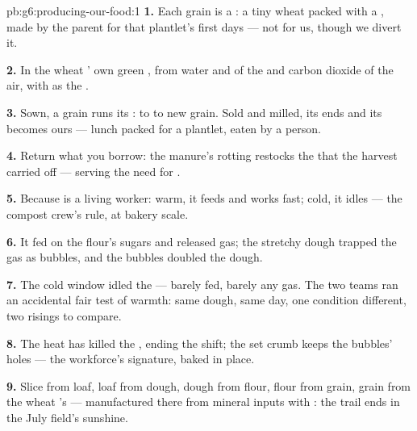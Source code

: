 \begin{solution}{pb:g6:producing-our-food:1}
\textbf{1.} Each grain is a : a tiny wheat  packed
with a , made by the parent for that plantlet's
first days --- not for us, though we divert it.

\textbf{2.} In the wheat ' own green , from
water and  of the  and carbon dioxide of
the air, with  as the .

\textbf{3.} Sown, a grain runs its : 
to  to new grain. Sold and milled, its  ends
and its  becomes ours --- lunch packed for a
plantlet, eaten by a person.

\textbf{4.} Return what you borrow: the manure's rotting
restocks the  that the harvest carried off ---
serving the need for .

\textbf{5.} Because  is a living worker: warm, it
feeds and works fast; cold, it idles --- the compost crew's
rule, at bakery scale.

\textbf{6.} It fed on the flour's sugars and released gas;
the stretchy dough trapped the gas as bubbles, and the
bubbles doubled the dough.

\textbf{7.} The cold window idled the  --- barely fed,
barely any gas. The two teams ran an accidental fair test
of warmth: same dough, same day, one condition different,
two risings to compare.

\textbf{8.} The heat has killed the , ending the
shift; the set crumb keeps the bubbles' holes --- the
workforce's signature, baked in place.

\textbf{9.} Slice from loaf, loaf from dough, dough from
flour, flour from grain, grain from the wheat 's
 --- manufactured there from mineral inputs with
: the trail ends in the July field's sunshine.


\end{solution}
